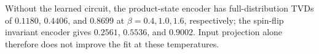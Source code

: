 Without the learned circuit, the product-state encoder has full-distribution TVDs of $0.1180$, $0.4406$, and $0.8699$ at $\beta=0.4,1.0,1.6$, respectively; the spin-flip invariant encoder gives $0.2561$, $0.5536$, and $0.9002$. Input projection alone therefore does not improve the fit at these temperatures.

